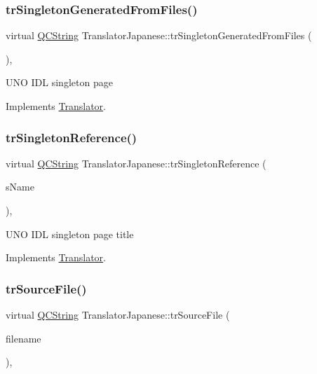 \subsubsection{\texorpdfstring{trSingletonGeneratedFromFiles()}{trSingletonGeneratedFromFiles()}}
{\footnotesize\ttfamily virtual \mbox{\hyperlink{class_q_c_string}{Q\+C\+String}} Translator\+Japanese\+::tr\+Singleton\+Generated\+From\+Files (\begin{DoxyParamCaption}\item[{bool}]{ }\end{DoxyParamCaption})\hspace{0.3cm}{\ttfamily [inline]}, {\ttfamily [virtual]}}

U\+NO I\+DL singleton page 

Implements \mbox{\hyperlink{class_translator}{Translator}}.

\mbox{\label{class_translator_japanese_ad3e2169c1f01d73def68f0dfa57b7aa8}} 
\subsubsection{\texorpdfstring{trSingletonReference()}{trSingletonReference()}}
{\footnotesize\ttfamily virtual \mbox{\hyperlink{class_q_c_string}{Q\+C\+String}} Translator\+Japanese\+::tr\+Singleton\+Reference (\begin{DoxyParamCaption}\item[{const char $\ast$}]{s\+Name }\end{DoxyParamCaption})\hspace{0.3cm}{\ttfamily [inline]}, {\ttfamily [virtual]}}

U\+NO I\+DL singleton page title 

Implements \mbox{\hyperlink{class_translator}{Translator}}.

\mbox{\label{class_translator_japanese_af846fcd0b7f8fc1af60c8d5a753016a8}} 
\subsubsection{\texorpdfstring{trSourceFile()}{trSourceFile()}}
{\footnotesize\ttfamily virtual \mbox{\hyperlink{class_q_c_string}{Q\+C\+String}} Translator\+Japanese\+::tr\+Source\+File (\begin{DoxyParamCaption}\item[{\mbox{\hyperlink{class_q_c_string}{Q\+C\+String}} \&}]{filename }\end{DoxyParamCaption})\hspace{0.3cm}{\ttfamily [inline]}, {\ttfamily [virtual]}}

